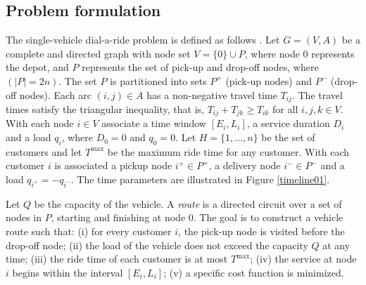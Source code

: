 \documentclass[dissertation,draft*]{aaltoseries}
\begin{document}
% 
% 
% 

\subsection{Problem formulation}
\label{staticnarrow}
The single-vehicle dial-a-ride problem is defined as follows \citep{berbegliafeas}. 
Let $G = (V, A)$ be a complete and directed graph
with node set $V = \{0\} \cup P$, where node $0$ represents the depot, and $P$ represents 
the set of pick-up and drop-off nodes, where  $(|P| = 2n)$. The set $P$ is partitioned into sets $P^{+}$ (pick-up nodes) and
$P^{-}$ (drop-off nodes). Each arc $(i, j) \in A$ has a non-negative travel time $T_{ij}$. The travel times
satisfy the triangular inequality, that is, $T_{ij} + T_{jk} \geq T_{ik}$ for all $i,j,k \in V$. 
With each node $i \in V$ associate a time window $[E_i , L_i ]$,
a service duration $D_i$ and a load $q_i$, where $D_0 = 0$ and $q_0 = 0$. Let $H = \{1, \ldots , n\}$ be
the set of customers and let $T^{\max}$ be the maximum ride time for any customer. With each customer $i$ is associated
a pickup node $i^{+} \in P^{+}$, a delivery node $i^{-} \in P^{-}$ and a load $q_{i^+} = -q_{i^-}$. 
The time parameters are illustrated in Figure \ref{timeline01}.

Let $Q$ be the capacity of the vehicle. 
A \emph{route} is a directed circuit over a set of nodes in $P$, starting and finishing at node $0$. The goal is to construct a
vehicle route such that: (i) for every customer $i$, the pick-up node is visited before the drop-off node;
(ii) the load of the vehicle does not exceed the capacity $Q$ at any time;
(iii) the ride time of each customer is at most $T^{\max}$;
(iv) the service at node $i$ begins within the interval $[E_i , L_i]$;
(v) a specific cost function is minimized.
\end{document}
